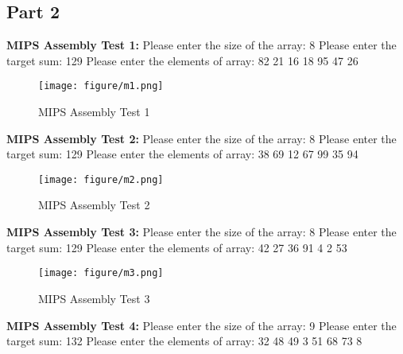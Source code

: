 \documentclass[twoside,11pt]{article}
\begin{document}
\newpage

\subsection{Part 2} 
\label{sec:background}

\textbf{MIPS Assembly Test 1:} \newline
Please enter the size of the array: 8 \newline
Please enter the target sum: 129 \newline
Please enter the elements of array:  82 21 16 18 95 47 26

\begin{figure}[h]
\caption{MIPS Assembly Test 1}
\centering
\texttt{[image: figure/m1.png]}
\end{figure}

\textbf{MIPS Assembly Test 2:} \newline
Please enter the size of the array: 8 \newline
Please enter the target sum: 129 \newline
Please enter the elements of array:  38 69 12 67 99 35 94 \newline

\begin{figure}[h]
\caption{MIPS Assembly Test 2}
\centering
\texttt{[image: figure/m2.png]}
\end{figure}

\newpage

\textbf{MIPS Assembly Test 3:} \newline
Please enter the size of the array: 8 \newline
Please enter the target sum: 129 \newline
Please enter the elements of array:  42 27 36 91 4 2 53 \newline

\begin{figure}[h]
\caption{MIPS Assembly Test 3}
\centering
\texttt{[image: figure/m3.png]}
\end{figure}

\textbf{MIPS Assembly Test 4:} \newline
Please enter the size of the array: 9 \newline
Please enter the target sum: 132 \newline
Please enter the elements of array:  32 48 49 3 51 68 73 8 \newline
\end{document}
